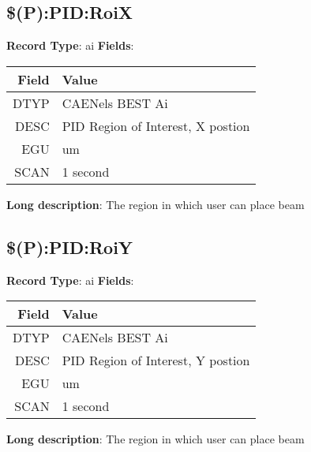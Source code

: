 \subsection{\$(P):PID:RoiX}
\textbf{Record Type}: ai \newline \newline 
\textbf{Fields}: \newline 
\begin{tabularx}{0.7\linewidth}{|r|X|}
\hline Field & Value \\
\hline
\hline
DTYP & CAENels BEST Ai\\
\hline
DESC & PID Region of Interest, X postion\\
\hline
EGU & um\\
\hline
SCAN & 1 second\\
\hline
\end{tabularx}
\newline \newline \newline
\textbf{Long description}: \newline 
 The region in which user can place beam
\newline \newline


\subsection{\$(P):PID:RoiY}
\textbf{Record Type}: ai \newline \newline 
\textbf{Fields}: \newline 
\begin{tabularx}{0.7\linewidth}{|r|X|}
\hline Field & Value \\
\hline
\hline
DTYP & CAENels BEST Ai\\
\hline
DESC & PID Region of Interest, Y postion\\
\hline
EGU & um\\
\hline
SCAN & 1 second\\
\hline
\end{tabularx}
\newline \newline \newline
\textbf{Long description}: \newline 
 The region in which user can place beam
\newline \newline


